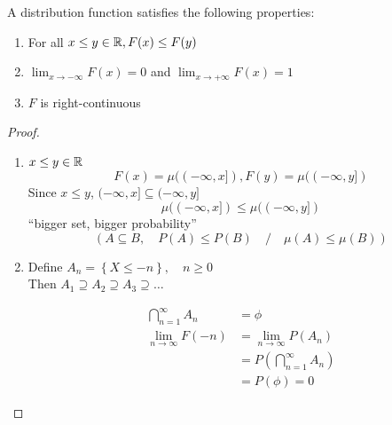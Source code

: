 \begin{theorem}
    A distribution function satisfies the following properties:
    \begin{enumerate}[label = \roman*)]
        \item For all $x \leq y \in \mathbb{R}, F(x) \leq F(y)$
        \item $\lim_{x \to -\infty} F(x) = 0 $ and $\lim_{x \to +\infty} F(x) = 1 $
        \item $F$ is right-continuous
    \end{enumerate}
    \begin{proof}
        \begin{enumerate}[label = \roman*)]
            \item $x\leq y \in \mathbb{R}$
            \[F(x) = \mu((-\infty, x]), F(y) = \mu((-\infty, y])\]
            Since $x\leq y$, \quad $(-\infty, x] \subseteq (-\infty, y]$
            \[\mu((-\infty, x])\leq \mu((-\infty, y])\]
            ``bigger set, bigger probability''
            \[(A \subseteq B, \quad P(A) \leq P(B) \quad / \quad \mu(A)\leq \mu(B))\]
            \item Define $A_n = \left\{X\leq -n\right\}, \quad n\geq 0$
            \\Then $A_1 \supseteq A_2 \supseteq A_3 \supseteq \dots $
            \begin{center}
            \end{center}
            \begin{align*}
                \bigcap_{n=1}^{\infty} A_n &= \phi \\
                \lim_{n \to \infty} F(-n) &= \lim_{n \to \infty} P(A_n) \\
                &= P\left(\bigcap_{n=1}^{\infty}A_n\right) \\
                &= P(\phi) = 0
            \end{align*}

\end{enumerate}
\end{proof}
\end{theorem}

